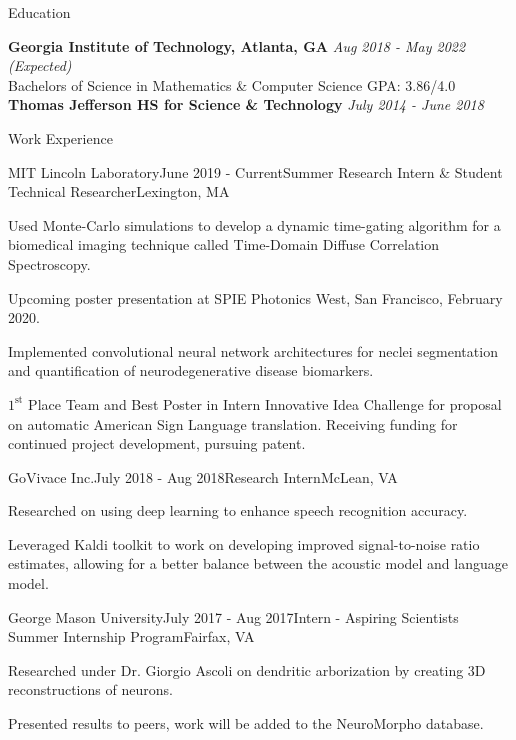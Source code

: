 \documentclass{template} %
\begin{document}

\begin{rSection}{Education}

{\bf Georgia Institute of Technology, Atlanta, GA} \hfill {\em Aug 2018 - May 2022 (Expected)}
\\ Bachelors of Science in Mathematics \& Computer Science \hfill  GPA: 3.86/4.0 \medskip
\\ {\bf Thomas Jefferson HS for Science \& Technology} \hfill {\em July 2014 - June 2018}
\end{rSection}


\begin{rSection}{Work Experience}

\begin{rSubsection}{MIT Lincoln Laboratory}{June 2019 - Current}{Summer Research Intern \& Student Technical Researcher}{Lexington, MA}
\item Used Monte-Carlo simulations to develop a  dynamic time-gating algorithm for a biomedical imaging technique called Time-Domain Diffuse Correlation Spectroscopy. 
\item Upcoming poster presentation at SPIE Photonics West, San Francisco, February 2020.
\item Implemented convolutional neural network architectures for neclei segmentation and quantification of neurodegenerative disease biomarkers.
\item$1^{\text{st}}$ Place Team and Best Poster in Intern Innovative Idea Challenge for proposal on automatic American Sign Language translation. Receiving funding for continued project development, pursuing patent.
\end{rSubsection}

\begin{rSubsection}{GoVivace Inc.}{July 2018 - Aug 2018}{Research Intern}{McLean, VA}
\item Researched on using deep learning to enhance speech recognition accuracy.
\item Leveraged Kaldi toolkit to work on developing improved signal-to-noise ratio estimates, allowing for a better balance between the acoustic model and language model.
\end{rSubsection}

\begin{rSubsection}{George Mason University}{July 2017 - Aug 2017}{Intern - Aspiring Scientists Summer Internship Program}{Fairfax, VA}
\item Researched under Dr. Giorgio Ascoli on dendritic arborization by creating 3D reconstructions of neurons.
\item Presented results to peers, work will be added to the NeuroMorpho database.
\end{rSubsection}


\end{rSection}
\end{document}
